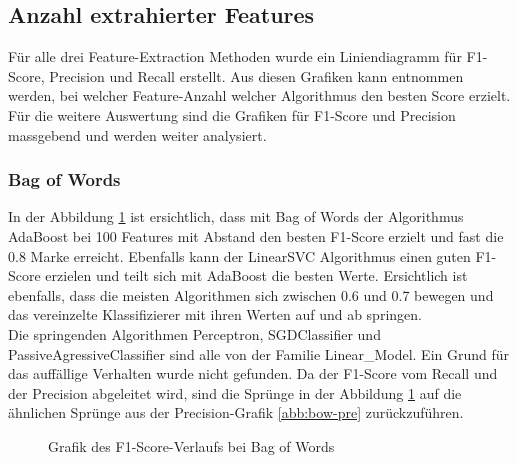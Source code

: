 \subsection{Anzahl extrahierter Features}
Für alle drei Feature-Extraction Methoden wurde ein Liniendiagramm für F1-Score, Precision und Recall erstellt.
Aus diesen Grafiken kann entnommen werden, bei welcher Feature-Anzahl welcher Algorithmus den besten Score erzielt.
Für die weitere Auswertung sind die Grafiken für F1-Score und Precision massgebend und werden weiter analysiert.
\subsubsection{Bag of Words}
In der Abbildung \cref{abb:bow-f1} ist ersichtlich, dass mit \glqq Bag of Words\grqq{} der Algorithmus AdaBoost bei 100 Features mit Abstand den besten F1-Score erzielt und fast die 0.8 Marke erreicht.
Ebenfalls kann der LinearSVC Algorithmus einen guten F1-Score erzielen und teilt sich mit AdaBoost die besten Werte.
Ersichtlich ist ebenfalls, dass die meisten Algorithmen sich zwischen 0.6 und 0.7 bewegen und das vereinzelte Klassifizierer mit ihren Werten auf und ab springen.\\
Die springenden Algorithmen Perceptron, SGDClassifier und PassiveAgressiveClassifier sind alle von der Familie \glqq Linear\_Model\grqq{}. Ein Grund für das auffällige Verhalten wurde nicht gefunden.
Da der F1-Score vom Recall und der Precision abgeleitet wird, sind die Sprünge in der Abbildung \cref{abb:bow-f1} auf die ähnlichen Sprünge aus der Precision-Grafik \cref{abb:bow-pre} zurückzuführen.\\
\begin{figure}[H]	
	\setlength{\fboxsep}{0.3pt} 
	\setlength{\fboxrule}{0.3pt} 
	\caption{Grafik des F1-Score-Verlaufs bei Bag of Words}
	\label{abb:bow-f1}
\end{figure}
